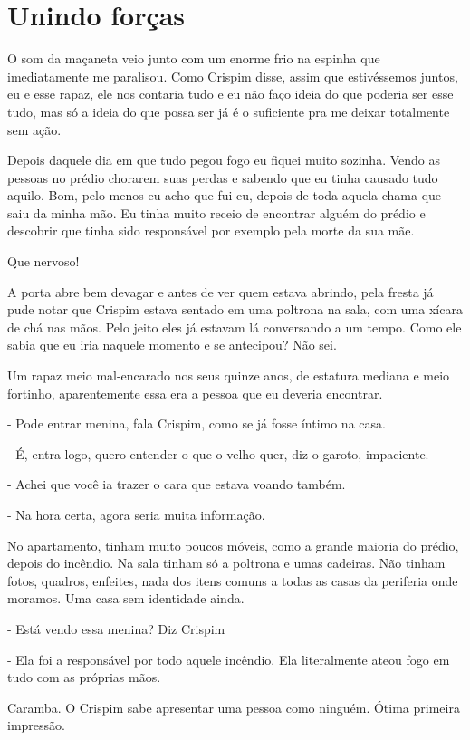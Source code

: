 \chapter{Unindo forças}
O som da maçaneta veio junto com um enorme frio na espinha que imediatamente me paralisou. Como Crispim disse, assim que estivéssemos juntos, eu e esse rapaz, ele nos contaria tudo e eu não faço ideia do que poderia ser esse tudo, mas só a ideia do que possa ser já é o suficiente pra me deixar totalmente sem ação.

Depois daquele dia em que tudo pegou fogo eu fiquei muito sozinha. Vendo as pessoas no prédio chorarem suas perdas e sabendo que eu tinha causado tudo aquilo. Bom, pelo menos eu acho que fui eu, depois de toda aquela chama que saiu da minha mão. Eu tinha muito receio de encontrar alguém do prédio e descobrir que tinha sido responsável por exemplo pela morte da sua mãe.

Que nervoso!

A porta abre bem devagar e antes de ver quem estava abrindo, pela fresta já pude notar que Crispim estava sentado em uma poltrona na sala, com uma xícara de chá nas mãos. Pelo jeito eles já estavam lá conversando a um tempo. Como ele sabia que eu iria naquele momento e se antecipou? Não sei.

Um rapaz meio mal-encarado nos seus quinze anos, de estatura mediana e meio fortinho, aparentemente essa era a pessoa que eu deveria encontrar.

- Pode entrar menina, fala Crispim, como se já fosse íntimo na casa.

- É, entra logo, quero entender o que o velho quer, diz o garoto, impaciente.

- Achei que você ia trazer o cara que estava voando também.

- Na hora certa, agora seria muita informação.

No apartamento, tinham muito poucos móveis, como a grande maioria do prédio, depois do incêndio. Na sala tinham só a poltrona e umas cadeiras. Não tinham fotos, quadros, enfeites, nada dos itens comuns a todas as casas da periferia onde moramos. Uma casa sem identidade ainda.

- Está vendo essa menina? Diz Crispim

- Ela foi a responsável por todo aquele incêndio. Ela literalmente ateou fogo em tudo com as próprias mãos.

Caramba. O Crispim sabe apresentar uma pessoa como ninguém. Ótima primeira impressão.

